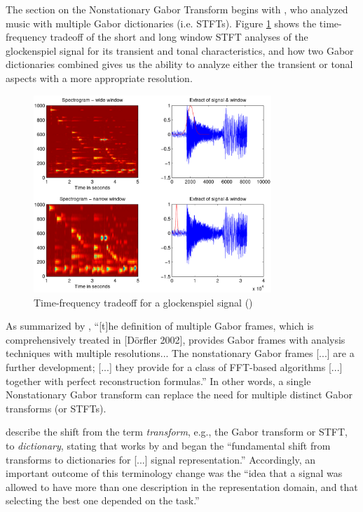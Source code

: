 \documentclass[report.tex]{subfiles}
\begin{document}
The section on the Nonstationary Gabor Transform begins with \textcite{doerflerphd}, who analyzed music with multiple Gabor dictionaries (i.e. STFTs). Figure \ref{fig:dorflertradeoff} shows the time-frequency tradeoff of the short and long window STFT analyses of the glockenspiel signal for its transient and tonal characteristics, and how two Gabor dictionaries combined gives us the ability to analyze either the transient or tonal aspects with a more appropriate resolution.

\begin{figure}[ht]
	\centering
	\includegraphics[width=0.8\textwidth]{./images-tftheory/tf_tradeoff_dorfler.png}
	\caption{Time-frequency tradeoff for a glockenspiel signal (\cite{doerflerphd})}
	\label{fig:dorflertradeoff}
\end{figure}

As summarized by \textcite{adaptivecqt}, ``[t]he definition of multiple Gabor frames, which is comprehensively treated in [D{\"o}rfler 2002], provides Gabor frames with analysis techniques with multiple resolutions... The nonstationary Gabor frames [...] are a further development; [...] they provide for a class of FFT-based algorithms [...] together with perfect reconstruction formulas.'' In other words, a single Nonstationary Gabor transform can replace the need for multiple distinct Gabor transforms (or STFTs).

\textcite{dictionary} describe the shift from the term \textit{transform}, e.g., the Gabor transform or STFT, to \textit{dictionary}, stating that works by \cite{dictionary1} and \cite{dictionary2} began the ``fundamental shift from transforms to dictionaries for [...] signal representation.'' Accordingly, an important outcome of this terminology change was the ``idea that a signal was allowed to have more than one description in the representation domain, and that selecting the best one depended on the task.''
\end{document}

